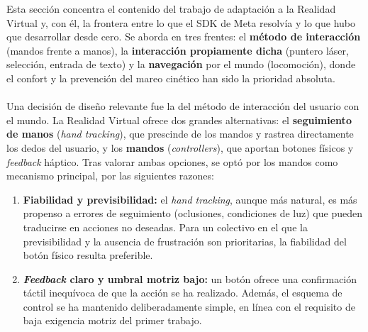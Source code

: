 \documentclass[12pt,twoside,titlepage]{report}
\begin{document}
Esta sección concentra el contenido del trabajo de adaptación a la Realidad Virtual y, con él, la frontera entre lo que el SDK de Meta resolvía y lo que hubo que desarrollar desde cero.
Se aborda en tres frentes: el \textbf{método de interacción} (mandos frente a manos), la \textbf{interacción propiamente dicha} (puntero láser, selección, entrada de texto) y la \textbf{navegación} por el mundo (locomoción), donde el confort y la prevención del mareo cinético han sido la prioridad absoluta.\\
\\
Una decisión de diseño relevante fue la del método de interacción del usuario con el mundo.
La Realidad Virtual ofrece dos grandes alternativas: el \textbf{seguimiento de manos} (\textit{hand tracking}), que prescinde de los mandos y rastrea directamente los dedos del usuario, y los \textbf{mandos} (\textit{controllers}), que aportan botones físicos y \textit{feedback} háptico.
Tras valorar ambas opciones, se optó por los mandos como mecanismo principal, por las siguientes razones:

\begin{enumerate}[label=\textbf{\arabic*.}, leftmargin=1.5cm, itemsep=0.5em]
  \item \textbf{Fiabilidad y previsibilidad:} el \textit{hand tracking}, aunque más natural, es más propenso a errores de seguimiento (oclusiones, condiciones de luz) que pueden traducirse en acciones no deseadas.
Para un colectivo en el que la previsibilidad y la ausencia de frustración son prioritarias, la fiabilidad del botón físico resulta preferible.
  \item \textbf{\textit{Feedback} claro y umbral motriz bajo:} un botón ofrece una confirmación táctil inequívoca de que la acción se ha realizado.
Además, el esquema de control se ha mantenido deliberadamente simple, en línea con el requisito de baja exigencia motriz del primer trabajo.
\end{enumerate}
\end{document}
